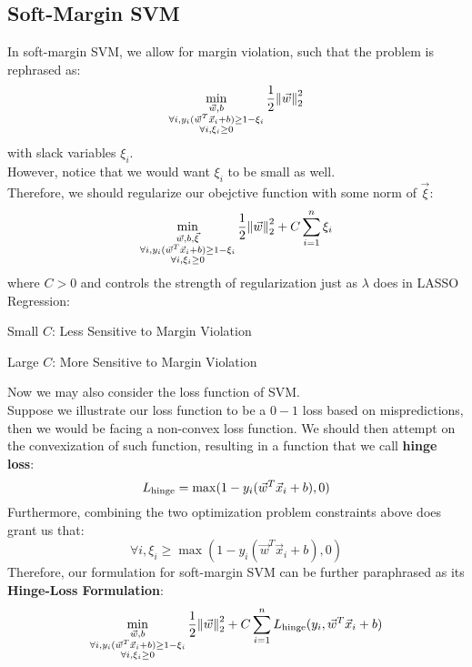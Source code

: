 \subsection{Soft-Margin SVM}
In soft-margin SVM, we allow for margin violation, such that the problem is rephrased as:
\[
    \min_{
        \substack{
            \vec{w}, b \\
            \forall i, y_i (\vec{w}^T \vec{x}_i + b) \geq 1 - \xi_i \\
            \forall i, \xi_i \geq 0
        }
    }
    \frac{1}{2} \pnorm[2]{\vec{w}}{2}
\]
with slack variables $\xi_i$. \\
However, notice that we would want $\xi_i$ to be small as well. \\
Therefore, we should regularize our obejctive function with some norm of $\vec{\xi}$:
\[
    \min_{
        \substack{
            \vec{w}, b, \vec{\xi} \\
            \forall i, y_i (\vec{w}^T \vec{x}_i + b) \geq 1 - \xi_i \\
            \forall i, \xi_i \geq 0
        }
    }
    \frac{1}{2} \pnorm[2]{\vec{w}}{2} + C \sum_{i = 1}^n \xi_i
\]
where $C > 0$ and controls the strength of regularization just as $\lambda$ does in LASSO Regression:
\begin{bindenum}
    \item Small $C$: Less Sensitive to Margin Violation
    \item Large $C$: More Sensitive to Margin Violation
\end{bindenum}

Now we may also consider the loss function of SVM. \\
Suppose we illustrate our loss function to be a $0-1$ loss based on mispredictions, then we would be facing a non-convex loss function.
We should then attempt on the convexization of such function, resulting in a function that we call \textbf{hinge loss}:
\[
    L_{\rm hinge} = \max(1 - y_i (\vec{w}^T \vec{x}_i + b), 0)
\]
Furthermore, combining the two optimization problem constraints above does grant us that:
\[
    \forall i, \xi_i \geq \max(1 - y_i (\vec{w}^T \vec{x}_i + b), 0)
\]
Therefore, our formulation for soft-margin SVM can be further paraphrased as its \textbf{Hinge-Loss Formulation}:
\[
    \min_{
        \substack{
            \vec{w}, b \\
            \forall i, y_i (\vec{w}^T \vec{x}_i + b) \geq 1 - \xi_i \\
            \forall i, \xi_i \geq 0
        }
    }
    \frac{1}{2} \pnorm[2]{\vec{w}}{2} + C \sum_{i = 1}^n L_{\rm hinge} (y_i, \vec{w}^T \vec{x}_i + b)
\]

